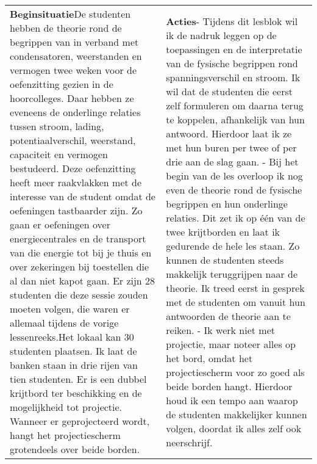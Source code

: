 \begin{landscape}
	\begin{tabularx}{1.56\textwidth}{|p{}|X|}
		\hline
		\multirow{2}{0.55\textwidth}{\textbf{Beginsituatie}\newline De studenten hebben de theorie rond de  begrippen van in verband met condensatoren, weerstanden en vermogen twee weken voor de oefenzitting gezien in de hoorcolleges. Daar hebben ze eveneens de onderlinge relaties tussen stroom, lading, potentiaalverschil, weerstand, capaciteit en vermogen bestudeerd. \newline\newline Deze oefenzitting heeft meer raakvlakken met de interesse van de student omdat de oefeningen tastbaarder zijn. Zo gaan er oefeningen over energiecentrales en de transport van die energie tot bij je thuis en over zekeringen bij toestellen die al dan niet kapot gaan. Er zijn 28 studenten die deze sessie zouden moeten volgen, die waren er allemaal tijdens de vorige lessenreeks.\newline\newline Het lokaal kan 30 studenten plaatsen. Ik laat de banken staan in drie rijen van tien studenten. Er is een dubbel krijtbord ter beschikking en de mogelijkheid tot projectie. Wanneer er geprojecteerd wordt, hangt het projectiescherm grotendeels over beide borden.  }& \textbf{Acties}\newline  - Tijdens dit lesblok wil ik de nadruk leggen op de toepassingen en de interpretatie van de fysische begrippen rond spanningsverschil en stroom. Ik wil dat de studenten die eerst zelf formuleren om daarna terug te koppelen, afhankelijk van hun antwoord. Hierdoor laat ik ze met hun buren per twee of per drie aan de slag gaan.     \newline\newline
		- Bij het begin van de les overloop ik nog even de theorie rond de fysische begrippen en hun onderlinge relaties. Dit zet ik op één van de twee krijtborden en laat ik gedurende de hele les staan. Zo kunnen de studenten steeds makkelijk teruggrijpen naar de theorie. Ik treed eerst in gesprek met de studenten om vanuit hun antwoorden de theorie aan te reiken. \newline\newline
		- Ik werk niet met projectie, maar noteer alles op het bord, omdat het projectiescherm voor zo goed als beide borden hangt. Hierdoor houd ik een tempo aan waarop de studenten makkelijker kunnen volgen, doordat ik alles zelf ook neerschrijf.  
		

\end{tabularx}
\end{landscape}

